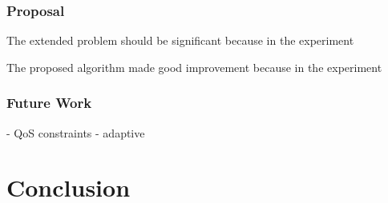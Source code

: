 \documentclass[senior,final,11pt]{iscs-thesis}
\begin{document}
\subsection{Proposal}
The extended problem should be significant because in the experiment

The proposed algorithm made good improvement because in the experiment 


\subsection{Future Work}
- QoS constraints
- adaptive


\chapter{Conclusion}

 
 
\end{document}
